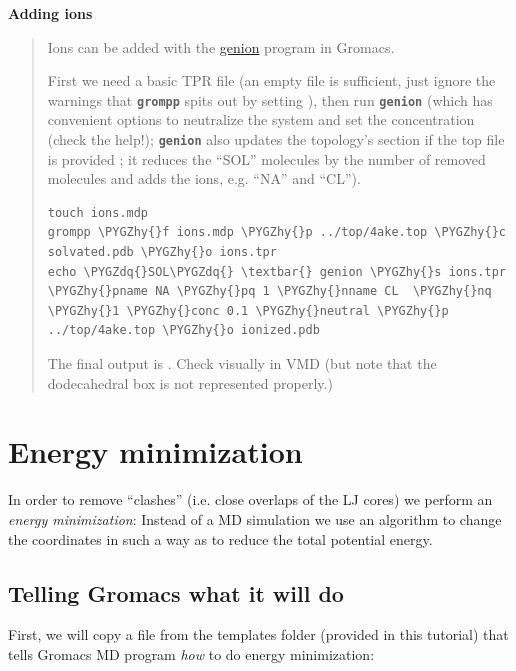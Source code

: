 \documentclass[letterpaper,10pt,english]{sphinxmanual}
\def\PYGZhy{\char`\-}
\def\PYGZdq{\char`\"}
\begin{document}
\textbf{Adding ions}
\begin{quote}

Ions can be added with the \href{http://manual.gromacs.org/current/online/genion.html}{genion} program in Gromacs.

First we need a basic TPR file (an empty file is sufficient, just
ignore the warnings that \textbf{\texttt{grompp}} spits out by setting
), then run \textbf{\texttt{genion}} (which has convenient
options to neutralize the system and set the concentration (check
the help!); \textbf{\texttt{genion}} also updates the topology's \code{{[} system
{]}} section if the top file is provided \footnotemark[2]; it reduces the
``SOL'' molecules by the number of removed molecules and adds the
ions, e.g. ``NA'' and ``CL'').

\begin{Verbatim}[commandchars=\\\{\}]
touch ions.mdp
grompp \PYGZhy{}f ions.mdp \PYGZhy{}p ../top/4ake.top \PYGZhy{}c solvated.pdb \PYGZhy{}o ions.tpr
echo \PYGZdq{}SOL\PYGZdq{} \textbar{} genion \PYGZhy{}s ions.tpr \PYGZhy{}pname NA \PYGZhy{}pq 1 \PYGZhy{}nname CL  \PYGZhy{}nq \PYGZhy{}1 \PYGZhy{}conc 0.1 \PYGZhy{}neutral \PYGZhy{}p ../top/4ake.top \PYGZhy{}o ionized.pdb
\end{Verbatim}

The final output is . Check visually in VMD
(but note that the dodecahedral box is not represented properly.)
\end{quote}


\chapter{Energy minimization}
\label{energy_minimization:energy-minimization}\label{energy_minimization::doc}\label{energy_minimization:id1}
In order to remove ``clashes'' (i.e. close overlaps of the LJ cores) we
perform an \emph{energy minimization}: Instead of a MD simulation we use an
algorithm to change the coordinates in such a way as to reduce the
total potential energy.


\section{Telling Gromacs what it will do}
\label{energy_minimization:telling-gromacs-what-it-will-do}
First, we will copy a file from the templates folder (provided in this
tutorial) that tells Gromacs MD program \emph{how} to do energy minimization:
\end{document}
